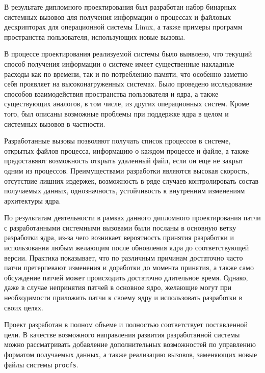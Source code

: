 \pagebreak
{}
\label{sec:outro}

В результате дипломного проектирования был разработан набор бинарных системных
вызовов для получения информации о процессах и файловых дескрипторах для
операционной системы Linux, а также примеры программ пространства пользователя,
использующих новые вызовы.

В процессе проектирования реализуемой системы было выявлено, что текущий способ
получения информации о системе имеет существенные накладные расходы как по
времени, так и по потреблению памяти, что особенно заметно себя проявляет на
высоконагруженных системах. Было проведено исследование способов взаимодействия
пространства пользователя и ядра, а также существующих аналогов, в том числе, из
других операционных систем. Кроме того, был описаны возможные проблемы при
поддержке ядра в целом и системных вызовов в частности.

Разработанные вызовы позволяют получать список процессов в системе, открытых
файлов процесса, информацию о каждом процессе и файле, а также предоставяют
возможность открыть удаленный файл, если он еще не закрыт одним из процессов.
Преимуществами разработки являются высокая скорость, отсутствие лишних издержек,
возможность в ряде случаев контролировать состав получаемых данных,
однозначность, устойчивость к внутренним изменениям архитектуры ядра.

По результатам деятельности в рамках данного дипломного проектирования патчи с
разработанными системными вызовами были посланы в основную ветку разработки
ядра, из-за чего возникает вероятность принятия разработки и использования
любым желающим после обновления ядра до соответствующей версии. Практика
показывает, что по различным причинам достаточно часто патчи претерпевают
изменения и доработки до момента принятия, а также само обсуждение патчей может
происходить достаточно длительное время. Однако, даже в случае непринятия патчей
в основное ядро, желающие могут при необходимости приложить патчи к своему ядру
и использовать разработки в своих целях.

Проект разработан в полном объеме и полностью соответствует поставленной цели. В
качестве возможного направления развития разработанной системы можно
рассматривать добавление дополнительных возможностей по управлению форматом
получаемых данных, а также реализацию вызовов, заменяющих новые файлы системы
\texttt{procfs}.

